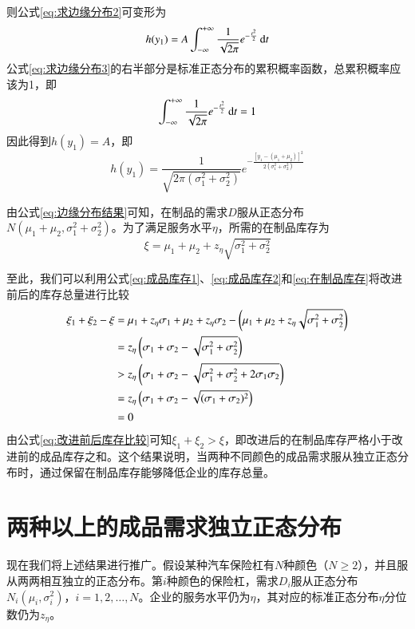 则公式\ref{eq:求边缘分布2}可变形为
\begin{equation}
h(y_1) = A\int_{-\infty}^{+\infty}\frac{1}{\sqrt{2\pi}}e^{-\frac{t^2}{2}}\operatorname{d\!} t
\label{eq:求边缘分布3}
\end{equation}
公式\ref{eq:求边缘分布3}的右半部分是标准正态分布的累积概率函数，总累积概率应该为1，即
\[
\int_{-\infty}^{+\infty}\frac{1}{\sqrt{2\pi}}e^{-\frac{t^2}{2}}\operatorname{d\!} t = 1
\]
因此得到$h(y_1)=A$，即
\begin{equation}
h(y_1) = \frac{1}{\sqrt{2\pi(\sigma_1^2+\sigma_2^2)}}e^{-\frac{[y_1-(\mu_1+\mu_2)]^2}{2(\sigma_1^2+\sigma_2^2)}}
\label{eq:边缘分布结果}
\end{equation}

由公式\ref{eq:边缘分布结果}可知，在制品的需求$D$服从正态分布$N(\mu_1+\mu_2,\sigma_1^2+\sigma_2^2)$。为了满足服务水平$\eta$，所需的在制品库存为
\begin{equation}
\xi = \mu_1 + \mu_2 + z_\eta\sqrt{\sigma_1^2+\sigma_2^2}
\label{eq:在制品库存}
\end{equation}

至此，我们可以利用公式\ref{eq:成品库存1}、\ref{eq:成品库存2}和\ref{eq:在制品库存}将改进前后的库存总量进行比较
\begin{align}
\xi_1 + \xi_2 - \xi &= \mu_1 + z_\eta\sigma_1 + \mu_2 + z_\eta\sigma_2 - \left(\mu_1 + \mu_2 + z_\eta\sqrt{\sigma_1^2+\sigma_2^2}\right) \notag\\
&= z_\eta\left(\sigma_1+\sigma_2-\sqrt{\sigma_1^2+\sigma_2^2}\right) \notag\\
&> z_\eta\left(\sigma_1+\sigma_2-\sqrt{\sigma_1^2+\sigma_2^2+2\sigma_1\sigma_2}\right) \notag\\
&= z_\eta\left(\sigma_1+\sigma_2-\sqrt{(\sigma_1+\sigma_2)^2}\right) \notag\\
&= 0
\label{eq:改进前后库存比较}
\end{align}
由公式\ref{eq:改进前后库存比较}可知$\xi_1+\xi_2>\xi$，即改进后的在制品库存严格小于改进前的成品库存之和。这个结果说明，当两种不同颜色的成品需求服从独立正态分布时，通过保留在制品库存能够降低企业的库存总量。



\section{两种以上的成品需求独立正态分布}

现在我们将上述结果进行推广。假设某种汽车保险杠有$N$种颜色（$N\geq 2$），并且服从两两相互独立的正态分布。第$i$种颜色的保险杠，需求$D_i$服从正态分布$N_i(\mu_i,\sigma_i^2)$，$i=1,2,\ldots,N$。企业的服务水平仍为$\eta$，其对应的标准正态分布$\eta$分位数仍为$z_\eta$。

